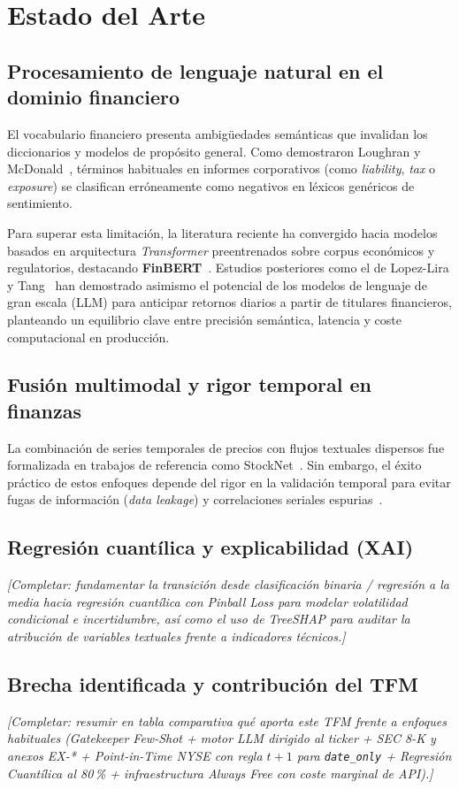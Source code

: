 \chapter{Estado del Arte}

\section{Procesamiento de lenguaje natural en el dominio financiero}
El vocabulario financiero presenta ambigüedades semánticas que invalidan los diccionarios y modelos de propósito general. Como demostraron Loughran y McDonald~\cite{loughran2011liability}, términos habituales en informes corporativos (como \textit{liability}, \textit{tax} o \textit{exposure}) se clasifican erróneamente como negativos en léxicos genéricos de sentimiento.

Para superar esta limitación, la literatura reciente ha convergido hacia modelos basados en arquitectura \textit{Transformer} preentrenados sobre corpus económicos y regulatorios, destacando \textbf{FinBERT}~\cite{araci2019finbert}. Estudios posteriores como el de Lopez-Lira y Tang~\cite{lopezlira2023chatgpt} han demostrado asimismo el potencial de los modelos de lenguaje de gran escala (LLM) para anticipar retornos diarios a partir de titulares financieros, planteando un equilibrio clave entre precisión semántica, latencia y coste computacional en producción.

\section{Fusión multimodal y rigor temporal en finanzas}
La combinación de series temporales de precios con flujos textuales dispersos fue formalizada en trabajos de referencia como StockNet~\cite{xu2018stock}. Sin embargo, el éxito práctico de estos enfoques depende del rigor en la validación temporal para evitar fugas de información (\textit{data leakage}) y correlaciones seriales espurias~\cite{lopezdeprado2018advances, jansen2020ml}.

\section{Regresión cuantílica y explicabilidad (XAI)}
\textit{[Completar: fundamentar la transición desde clasificación binaria / regresión a la media hacia regresión cuantílica con Pinball Loss para modelar volatilidad condicional e incertidumbre, así como el uso de TreeSHAP para auditar la atribución de variables textuales frente a indicadores técnicos.]}

\section{Brecha identificada y contribución del TFM}
\textit{[Completar: resumir en tabla comparativa qué aporta este TFM frente a enfoques habituales (Gatekeeper Few-Shot + motor LLM dirigido al ticker + SEC 8-K y anexos EX-* + Point-in-Time NYSE con regla $t+1$ para \texttt{date\_only} + Regresión Cuantílica al 80\,\% + infraestructura Always Free con coste marginal de API).]}
